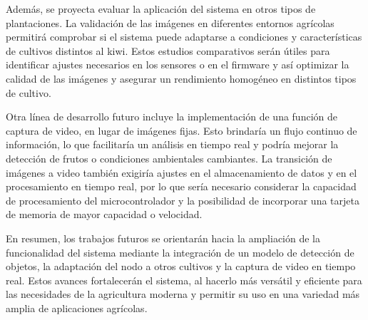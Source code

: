 Además, se proyecta evaluar la aplicación del sistema en otros tipos de plantaciones. La validación de las imágenes en diferentes entornos agrícolas permitirá comprobar si el sistema puede adaptarse a condiciones y características de cultivos distintos al kiwi. Estos estudios comparativos serán útiles para identificar ajustes necesarios en los sensores o en el firmware y así optimizar la calidad de las imágenes y asegurar un rendimiento homogéneo en distintos tipos de cultivo.

Otra línea de desarrollo futuro incluye la implementación de una función de captura de video, en lugar de imágenes fijas. Esto brindaría un flujo continuo de información, lo que facilitaría un análisis en tiempo real y podría mejorar la detección de frutos o condiciones ambientales cambiantes. La transición de imágenes a video también exigiría ajustes en el almacenamiento de datos y en el procesamiento en tiempo real, por lo que sería necesario considerar la capacidad de procesamiento del microcontrolador y la posibilidad de incorporar una tarjeta de memoria de mayor capacidad o velocidad.

En resumen, los trabajos futuros se orientarán hacia la ampliación de la funcionalidad del sistema mediante la integración de un modelo de detección de objetos, la adaptación del nodo a otros cultivos y la captura de video en tiempo real. Estos avances fortalecerán el sistema, al hacerlo más versátil y eficiente para las necesidades de la agricultura moderna y permitir su uso en una variedad más amplia de aplicaciones agrícolas.

\newpage